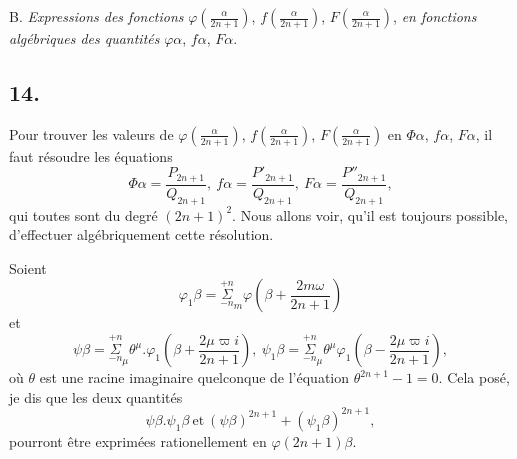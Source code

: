 \documentclass{article}
\begin{document}
B. \emph{Expressions des fonctions} $\varphi\left(\frac{\alpha}{2n+1}\right)$, $f\left(\frac{\alpha}{2n+1}\right)$, $F\left(\frac{\alpha}{2n+1}\right)$, \emph{en fonctions algébriques des quantités} $\varphi\alpha$, $f\alpha$, $F\alpha$.

\subsection*{14.}

Pour trouver les valeurs de $\varphi\left(\frac{\alpha}{2n+1}\right)$, $f\left(\frac{\alpha}{2n+1}\right)$, $F\left(\frac{\alpha}{2n+1}\right)$ en $\Phi\alpha$, $f\alpha$, $F\alpha$, il faut résoudre les équations
\[ \Phi\alpha=\frac{P_{2n+1}}{Q_{2n+1}},\ f\alpha=\frac{P'_{2n+1}}{Q_{2n+1}},\ F\alpha=\frac{P''_{2n+1}}{Q_{2n+1}}, \]
qui toutes sont du degré $(2n+1)^{2}$. Nous allons voir, qu'il est toujours possible, d'effectuer algébriquement cette résolution.


Soient
\[ \varphi_{1}\beta=\overset{+n}{\underset{-n}{\Sigma}}_{m}\varphi\left(\beta+\frac{2m\omega}{2n+1}\right) \tag{68.} \]
et
\[ \psi\beta=\overset{+n}{\underset{-n}{\Sigma}}_{\mu}\theta^{\mu}.\varphi_{1}\left(\beta+\frac{2\mu\varpi i}{2n+1}\right),\ \psi_{1}\beta=\overset{+n}{\underset{-n}{\Sigma}}_{\mu}\theta^{\mu}\varphi_{1}\left(\beta-\frac{2\mu\varpi i}{2n+1}\right), \tag{69.} \]
où $\theta$ est une racine imaginaire quelconque de l'équation $\theta^{2n+1}-1=0$.
Cela posé, je dis que les deux quantités
\[ \psi\beta.\psi_{1}\beta\ \text{et}\ (\psi\beta)^{2n+1}+(\psi_{1}\beta)^{2n+1}, \]
pourront être exprimées rationellement en $\varphi(2n+1)\beta$.
\end{document}
